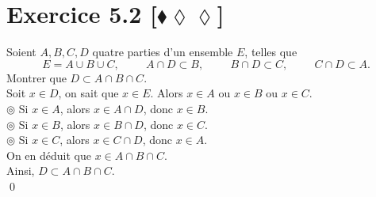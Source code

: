 \documentclass[10pt]{article}
\begin{document}

\section*{Exercice 5.2 [$\blacklozenge\lozenge\lozenge$]}
\begin{tcolorbox}[enhanced, width=7in, center, size=fbox, fontupper=\large, drop shadow southwest]
    Soient $A,B,C,D$ quatre parties d'un ensemble $E$, telles que
    \begin{equation*}
        E = A \cup B \cup C, \hspace{1cm} A \cap D \subset B, \hspace{1cm} B \cap D \subset C, \hspace{1cm} C \cap D \subset A.
    \end{equation*}
    Montrer que $D \subset A \cap B \cap C$.\\
    Soit $x \in D$, on sait que $x \in E$. Alors $x \in A$ ou $x \in B$ ou $x \in C$.\\
    $\circledcirc$ Si $x \in A$, alors $x \in A \cap D$, donc $x \in B$.\\
    $\circledcirc$ Si $x \in B$, alors $x \in B \cap D$, donc $x \in C$.\\
    $\circledcirc$ Si $x \in C$, alors $x \in C \cap D$, donc $x \in A$.\\
    On en déduit que $x \in A \cap B \cap C$.\\
    Ainsi, $D \subset A \cap B \cap C$.\\
    \qed
\end{tcolorbox}

\end{document}
